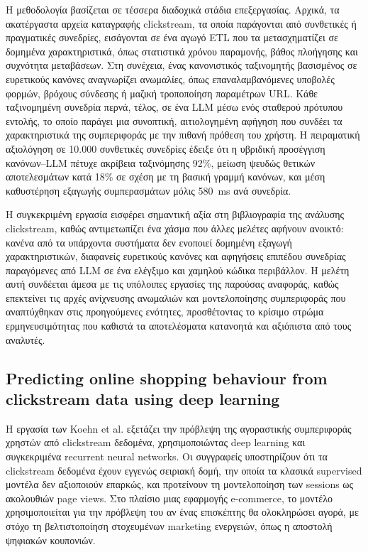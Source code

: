 \documentclass[12pt,a4paper]{article}
\begin{document}
	Η μεθοδολογία βασίζεται σε τέσσερα διαδοχικά στάδια επεξεργασίας. Αρχικά, τα ακατέργαστα αρχεία καταγραφής clickstream, τα οποία παράγονται από συνθετικές ή πραγματικές συνεδρίες, εισάγονται σε ένα αγωγό ETL που τα μετασχηματίζει σε δομημένα χαρακτηριστικά, όπως στατιστικά χρόνου παραμονής, βάθος πλοήγησης και συχνότητα μεταβάσεων. Στη συνέχεια, ένας κανονιστικός ταξινομητής βασισμένος σε ευρετικούς κανόνες αναγνωρίζει ανωμαλίες, όπως επαναλαμβανόμενες υποβολές φορμών, βρόχους σύνδεσης ή μαζική τροποποίηση παραμέτρων URL. Κάθε ταξινομημένη συνεδρία περνά, τέλος, σε ένα LLM μέσω ενός σταθερού πρότυπου εντολής, το οποίο παράγει μια συνοπτική, αιτιολογημένη αφήγηση που συνδέει τα χαρακτηριστικά της συμπεριφοράς με την πιθανή πρόθεση του χρήστη. Η πειραματική αξιολόγηση σε 10.000 συνθετικές συνεδρίες έδειξε ότι η υβριδική προσέγγιση κανόνων--LLM πέτυχε ακρίβεια ταξινόμησης 92\%, μείωση ψευδώς θετικών αποτελεσμάτων κατά 18\% σε σχέση με τη βασική γραμμή κανόνων, και μέση καθυστέρηση εξαγωγής συμπερασμάτων μόλις 580~ms ανά συνεδρία.
	
	Η συγκεκριμένη εργασία εισφέρει σημαντική αξία στη βιβλιογραφία της ανάλυσης clickstream, καθώς αντιμετωπίζει ένα χάσμα που άλλες μελέτες αφήνουν ανοικτό: κανένα από τα υπάρχοντα συστήματα δεν ενοποιεί δομημένη εξαγωγή χαρακτηριστικών, διαφανείς ευρετικούς κανόνες και αφηγήσεις επιπέδου συνεδρίας παραγόμενες από LLM σε ένα ελέγξιμο και χαμηλού κώδικα περιβάλλον. Η μελέτη αυτή συνδέεται άμεσα με τις υπόλοιπες εργασίες της παρούσας αναφοράς, καθώς επεκτείνει τις αρχές ανίχνευσης ανωμαλιών και μοντελοποίησης συμπεριφοράς που αναπτύχθηκαν στις προηγούμενες ενότητες, προσθέτοντας το κρίσιμο στρώμα ερμηνευσιμότητας που καθιστά τα αποτελέσματα κατανοητά και αξιόπιστα από τους αναλυτές.
	
	
	\subsection{Predicting online shopping behaviour from clickstream data using deep learning}
	
	
	Η εργασία των Koehn et al. \cite{koehn2020predicting} εξετάζει την πρόβλεψη της αγοραστικής συμπεριφοράς χρηστών από clickstream δεδομένα, χρησιμοποιώντας deep learning και συγκεκριμένα recurrent neural networks. Οι συγγραφείς υποστηρίζουν ότι τα clickstream δεδομένα έχουν εγγενώς σειριακή δομή, την οποία τα κλασικά supervised μοντέλα δεν αξιοποιούν επαρκώς, και προτείνουν τη μοντελοποίηση των sessions ως ακολουθιών page views. Στο πλαίσιο μιας εφαρμογής e-commerce, το μοντέλο χρησιμοποιείται για την πρόβλεψη του αν ένας επισκέπτης θα ολοκληρώσει αγορά, με στόχο τη βελτιστοποίηση στοχευμένων marketing ενεργειών, όπως η αποστολή ψηφιακών κουπονιών.
	
\end{document}
